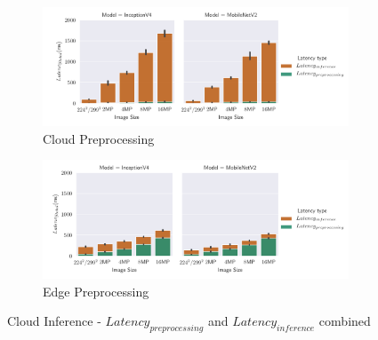 \begin{figure}[!htb]
\centering
\begin{subfigure}[b]{0.95\textwidth}
   \includegraphics[width=1\linewidth]{./Bilder/single_plots/cloud_inference_plots/Cloud_Preprocessing_Inference_Comb_cloud_prepro.pdf}
   \caption{Cloud Preprocessing}
   \label{fig:CloudInference+PreproCloud} 
\end{subfigure}

\begin{subfigure}[b]{0.95\textwidth}
   \includegraphics[width=1\linewidth]{./Bilder/single_plots/cloud_inference_plots/Cloud_Preprocessing_Inference_Comb_edge_prepro.pdf}
   \caption{Edge Preprocessing}
   \label{fig:CloudInference+PreproEdge}
\end{subfigure}

\caption{Cloud Inference -  $Latency_{preprocessing}$ and $Latency_{inference}$ combined}
\end{figure}


